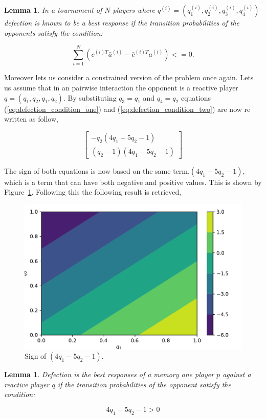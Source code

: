 \documentclass[10pt]{article}
\newtheorem{lemma}[theorem]{Lemma}
\begin{document}
\begin{lemma}
    In a tournament of \(N\) players where \(q^(i) = (q_{1}^(i), q_{2}^(i), q_{3}^(i), q_{4}^(i))\)
    defection is known to be a best response if the transition probabilities of the
    opponents satisfy the condition:

    \begin{equation}
        \sum_{i=1} ^ N (c^{(i)T} \bar{a}^{(i)} - \bar{c}^{(i)T} a^{(i)}) <= 0.
    \end{equation}
\end{lemma}

Moreover lets us consider a constrained version of the problem once again. Lets us
assume that in an pairwise interaction the opponent is a reactive player \(q=(q_1, q_2, q_1, q_2)\).
By substituting \(q_3=q_1\) and \(q_4=q_2\) equations (\ref{eq:defection_condition_one})
and (\ref{eq:defection_condition_two}) are now re written as follow,

\[\left[\begin{matrix}- q_{2} \left(4 q_{1} - 5 q_{2} - 1\right)\\
\left(q_{2} - 1\right) \left(4 q_{1} - 5 q_{2} - 1\right)\end{matrix}\right]\]

The sign of both equations is now based on the same term,\(\left(4 q_{1} - 5 q_{2} - 1\right)\),
which is a term that can have both negative and positive values. This is shown
by Figure~\ref{fig:sign_against_reactive}. Following this the following result is retrieved,

\begin{figure}[htbp]
    \centering
    \includegraphics[width=0.45\linewidth]{img/sign_against_reactive.pdf}
      \caption{Sign of \(\left(4 q_{1} - 5 q_{2} - 1\right)\).}
      \label{fig:sign_against_reactive}
  \end{figure}

\begin{lemma}
Defection is the best responses of a memory one player \(p\) against a reactive
player \(q\) if the transition probabilities of the opponent satisfy the
condition:

\begin{equation}
    4 q_{1} - 5 q_{2} - 1 > 0
\end{equation}
\end{lemma}
\end{document}
